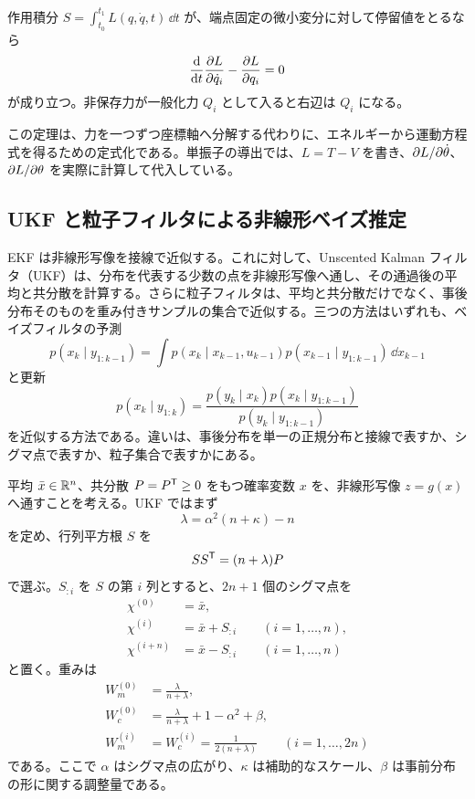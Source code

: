 \begin{theorem}
作用積分 $S=\int_{t_0}^{t_1}L(q,\dot{q},t)\,\dd t$ が、端点固定の微小変分に対して停留値をとるなら
\begin{equation}
  \frac{\mathrm{d}}{\mathrm{d} t}\frac{\partial L}{\partial\dot{q}_i}-\frac{\partial L}{\partial q_i}=0
\end{equation}
が成り立つ。非保存力が一般化力 $Q_i$ として入ると右辺は $Q_i$ になる。
\end{theorem}

この定理は、力を一つずつ座標軸へ分解する代わりに、エネルギーから運動方程式を得るための定式化である。単振子の導出では、$L=T-V$ を書き、$\partial L/\partial\dot{\theta}$、$\partial L/\partial\theta$ を実際に計算して代入している。

\subsection{UKF と粒子フィルタによる非線形ベイズ推定}

EKF は非線形写像を接線で近似する。これに対して、Unscented Kalman フィルタ（UKF）は、分布を代表する少数の点を非線形写像へ通し、その通過後の平均と共分散を計算する。さらに粒子フィルタは、平均と共分散だけでなく、事後分布そのものを重み付きサンプルの集合で近似する。三つの方法はいずれも、ベイズフィルタの予測
\begin{equation}
  p(x_k\mid y_{1:k-1})
  =
  \int p(x_k\mid x_{k-1},u_{k-1})
  p(x_{k-1}\mid y_{1:k-1})\,\dd x_{k-1}
\end{equation}
と更新
\begin{equation}
  p(x_k\mid y_{1:k})
  =
  \frac{p(y_k\mid x_k)p(x_k\mid y_{1:k-1})}
       {p(y_k\mid y_{1:k-1})}
\end{equation}
を近似する方法である。違いは、事後分布を単一の正規分布と接線で表すか、シグマ点で表すか、粒子集合で表すかにある。

\begin{definition}
平均 $\bar{x}\in\mathbb{R}^n$、共分散 $P=P^{\mathsf{T}}\ge0$ をもつ確率変数 $x$ を、非線形写像 $z=g(x)$ へ通すことを考える。UKF ではまず
\begin{equation}
  \lambda=\alpha^2(n+\kappa)-n
\end{equation}
を定め、行列平方根 $S$ を
\begin{equation}
  SS^{\mathsf{T}}=(n+\lambda)P
\end{equation}
で選ぶ。$S_{:i}$ を $S$ の第 $i$ 列とすると、$2n+1$ 個のシグマ点を
\begin{align}
  \chi^{(0)}&=\bar{x},\\
  \chi^{(i)}&=\bar{x}+S_{:i}\qquad(i=1,\ldots,n),\\
  \chi^{(i+n)}&=\bar{x}-S_{:i}\qquad(i=1,\ldots,n)
\end{align}
と置く。重みは
\begin{align}
  W_m^{(0)}&=\frac{\lambda}{n+\lambda},\\
  W_c^{(0)}&=\frac{\lambda}{n+\lambda}+1-\alpha^2+\beta,\\
  W_m^{(i)}&=W_c^{(i)}=\frac{1}{2(n+\lambda)}
  \qquad(i=1,\ldots,2n)
\end{align}
である。ここで $\alpha$ はシグマ点の広がり、$\kappa$ は補助的なスケール、$\beta$ は事前分布の形に関する調整量である。
\end{definition}

